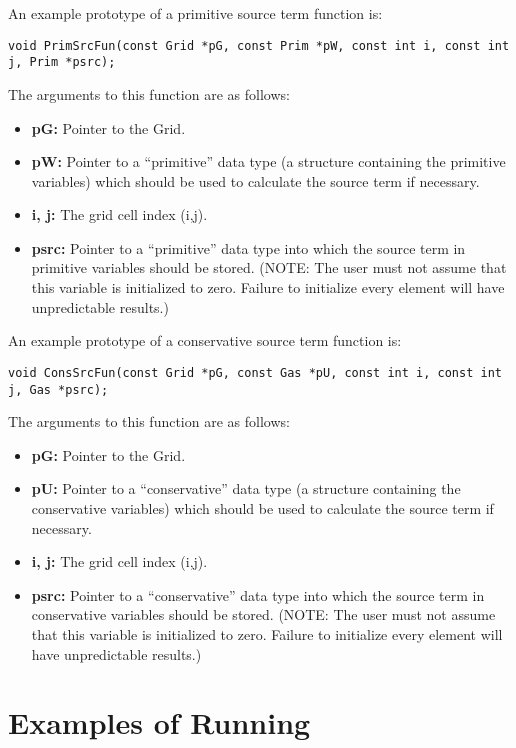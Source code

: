 An example prototype of a primitive source term function is:
\footnotesize
\begin{verbatim}
void PrimSrcFun(const Grid *pG, const Prim *pW, const int i, const int j, Prim *psrc);
\end{verbatim}
\normalsize
The arguments to this function are as follows:
\begin{itemize}
\item {\bf pG:} Pointer to the Grid.
\item {\bf pW:} Pointer to a ``primitive'' data type (a structure containing
the primitive variables) which should be used to calculate the source
term if necessary.
\item {\bf i, j:} The grid cell index (i,j).
\item {\bf psrc:} Pointer to a ``primitive'' data type into which the
source term in primitive variables should be stored.  (NOTE: The user
must not assume that this variable is initialized to zero.  Failure to
initialize every element will have unpredictable results.)
\end{itemize}


\noindent
An example prototype of a conservative source term function is:
\footnotesize
\begin{verbatim}
void ConsSrcFun(const Grid *pG, const Gas *pU, const int i, const int j, Gas *psrc);
\end{verbatim}
\normalsize
The arguments to this function are as follows:
\begin{itemize}
\item {\bf pG:} Pointer to the Grid.
\item {\bf pU:} Pointer to a ``conservative'' data type (a structure containing
the conservative variables) which should be used to calculate the source
term if necessary.
\item {\bf i, j:} The grid cell index (i,j).
\item {\bf psrc:} Pointer to a ``conservative'' data type into which the
source term in conservative variables should be stored.  (NOTE: The user
must not assume that this variable is initialized to zero.  Failure to
initialize every element will have unpredictable results.)
\end{itemize}



\section{Examples of Running \ath}

